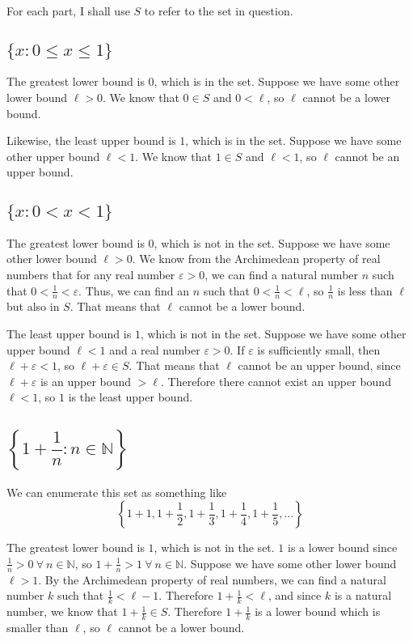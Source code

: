 \documentclass[a4paper]{article}
\begin{document}
For each part, I shall use $S$ to refer to the set in question.

\subsection{$\{x : 0 \le x \le 1\}$}

The greatest lower bound is $0$, which is in the set. Suppose we have some other lower bound $\ell > 0$. We know that $0 \in S$ and $0 < \ell$, so $\ell$ cannot be a lower bound.

Likewise, the least upper bound is $1$, which is in the set. Suppose we have some other upper bound $\ell < 1$. We know that $1 \in S$ and $\ell < 1$, so $\ell$ cannot be an upper bound.

\subsection{$\{x : 0 < x < 1\}$}

The greatest lower bound is $0$, which is not in the set. Suppose we have some other lower bound $\ell > 0$. We know from the Archimedean property of real numbers that for any real number $\varepsilon > 0$, we can find a natural number $n$ such that $0 < \frac{1}{n} < \varepsilon$. Thus, we can find an $n$ such that $0 < \frac{1}{n} < \ell$, so $\frac{1}{n}$ is less than $\ell$ but also in $S$. That means that $\ell$ cannot be a lower bound.

The least upper bound is $1$, which is not in the set. Suppose we have some other upper bound $\ell < 1$ and a real number $\varepsilon > 0$. If $\varepsilon$ is sufficiently small, then $\ell + \varepsilon < 1$, so $\ell + \varepsilon \in S$. That means that $\ell$ cannot be an upper bound, since $\ell + \varepsilon$ is an upper bound $> \ell$. Therefore there cannot exist an upper bound $\ell < 1$, so $1$ is the least upper bound.

\subsection{$\left\{ 1 + \dfrac{1}{n} : n \in \mathbb{N} \right\}$}

We can enumerate this set as something like $$\left\{ 1 + 1, 1 + \frac12, 1 + \frac13, 1 + \frac14, 1 + \frac15, \ldots \right\}$$

The greatest lower bound is $1$, which is not in the set. $1$ is a lower bound since $\frac1n > 0\ \forall\ n \in \mathbb N$, so $1 + \frac1n > 1\ \forall\ n \in \mathbb N$. Suppose we have some other lower bound $\ell > 1$. By the Archimedean property of real numbers, we can find a natural number $k$ such that $\frac1k < \ell - 1$. Therefore $1 + \frac1k < \ell$, and since $k$ is a natural number, we know that $1 + \frac1k \in S$. Therefore $1 + \frac1k$ is a lower bound which is smaller than $\ell$, so $\ell$ cannot be a lower bound.
\end{document}
